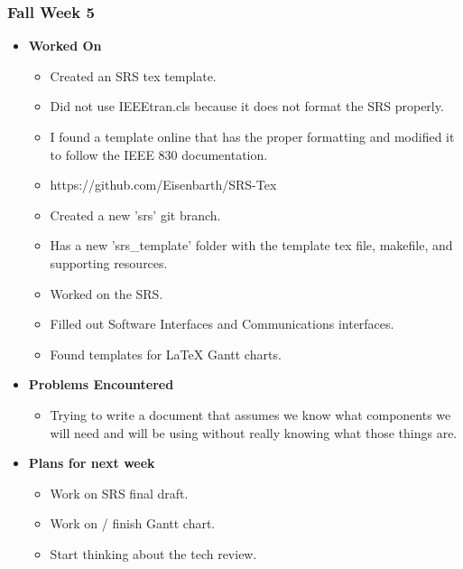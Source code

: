 \documentclass[compsoc,draftclsnofoot,onecolumn,10pt]{IEEEtran}
\begin{document}
\subsubsection{Fall Week 5}
\begin{itemize}
    \item {\textbf{Worked On}}
    \begin{itemize}
        \item Created an SRS tex template.
        \item Did not use IEEEtran.cls because it does not format the SRS properly.
        \item I found a template online that has the proper formatting and modified it to follow the IEEE 830 documentation.
        \item https://github.com/Eisenbarth/SRS-Tex
        \item Created a new 'srs' git branch.

        \item Has a new 'srs\_template' folder with the template tex file, makefile, and supporting resources.
        \item Worked on the SRS.

        \item Filled out Software Interfaces and Communications interfaces.
        \item Found templates for LaTeX Gantt charts.
    \end{itemize}

    \item {\textbf{Problems Encountered}}
    \begin{itemize}
        \item Trying to write a document that assumes we know what components we will need and will be using without really knowing what those things are.
    \end{itemize}

    \item{\textbf{Plans for next week}}
    \begin{itemize}
        \item Work on SRS final draft.
        \item Work on / finish Gantt chart.
        \item Start thinking about the tech review.
    \end{itemize}

\end{itemize}
\end{document}
